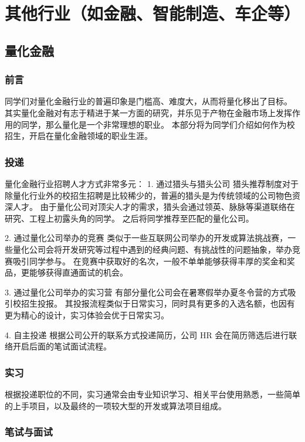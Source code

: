 \section{其他行业（如金融、智能制造、车企等）}

\subsection{量化金融}
\subsubsection{前言}

同学们对量化金融行业的普遍印象是门槛高、难度大，从而将量化移出了目标。
其实量化金融对有志于精进于某一方面的研究，并乐见于产物在金融市场上发挥作用的同学，那么量化是一个非常理想的职业。
本部分将为同学们介绍如何作为校招生，开启在量化金融领域的职业生涯。

\subsubsection{投递}

量化金融行业招聘人才方式非常多元：
1. 通过猎头与猎头公司
猎头推荐制度对于除量化行业外的校招生招聘是比较稀少的，普遍的猎头是为传统领域的公司物色资深人才。
由于量化公司对顶尖人才的需求，猎头会通过领英、脉脉等渠道联络在研究、工程上初露头角的同学。
之后将同学推荐至匹配的量化公司。

2. 通过量化公司举办的竞赛
类似于一些互联网公司举办的开发或算法挑战赛，一些量化公司会将开发研究等过程中遇到的经典问题、有挑战性的问题抽象，举办竞赛吸引同学参与。
在竞赛中获取好的名次，一般不单单能够获得丰厚的奖金和奖品，更能够获得直通面试的机会。

3. 通过量化公司举办的实习营
有部分量化公司会在暑寒假举办夏冬令营的方式吸引校招生投报。
其投报流程类似于日常实习，同时具有更多的入选名额，也因有更为精心的设计，实习体验会优于日常实习。

4. 自主投递
根据公司公开的联系方式投递简历，公司 HR 会在简历筛选后进行联络开启后面的笔试面试流程。

\subsubsection{实习}

根据投递职位的不同，实习通常会由专业知识学习、相关平台使用熟悉，一些简单的上手项目，以及最终的一项较大型的开发或算法项目组成。


\subsubsection{笔试与面试}

